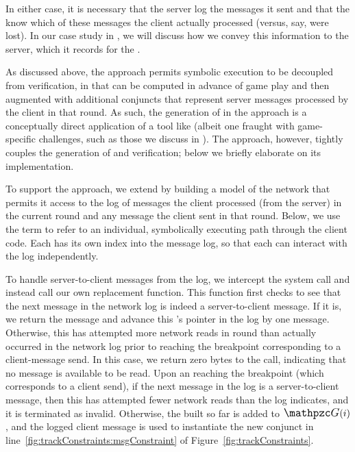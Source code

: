 In either case, it is necessary that the server log the messages it
sent and that the \verifier know which of these messages the client
actually processed (versus, say, were lost).  In our case study in
, we will discuss how we convey this information to
the server, which it records for the \verifier.

As discussed above, the \eager approach permits symbolic execution to
be decoupled from verification, in that \eager \pathsegcons can be
computed in advance of game play and then augmented with additional
conjuncts that represent server messages processed by the client in
that round.  As such, the generation of \pathsegcons in the \eager
approach is a conceptually direct application of a tool like \klee
(albeit one fraught with game-specific challenges, such as those we
discuss in ).  The \lazy approach,
however, tightly couples the generation of \pathsegcons and
verification; below we briefly elaborate on its implementation.

To support the \lazy approach, we extend \klee by building a model of
the network that permits it access to the log of messages the client
processed (from the server) in the current round \roundidx and any
message the client sent in that round.  Below, we use the term {\em
\thread} to refer to an individual, symbolically executing path
through the client code.  Each \thread has its own index into the
message log, so that each can interact with the log independently.

To handle server-to-client messages from the log, we intercept the
\recv system call and instead call our own replacement function.  This
function first checks to see that the next message in the network log
is indeed a server-to-client message.  If it is, we return the message
and advance this \thread's pointer in the log by one message.
Otherwise, this \thread has attempted more network reads in round
\roundidx than actually occurred in the network log prior to reaching
the breakpoint corresponding to a client-message send.  In this case,
we return zero bytes to the \recv call, indicating that no message is
available to be read.  Upon an \thread reaching the breakpoint (which
corresponds to a client send), if the next message in the log is a
server-to-client message, then this \thread has attempted fewer
network reads than the log indicates, and it is terminated as invalid.
Otherwise, the \pathsegcon built so far is added to
$\genericPathConstraints(\roundidx)$, and the logged client message is
used to instantiate the new conjunct \msgConstraint in
line~\ref{fig:trackConstraints:msgConstraint} of
Figure~\ref{fig:trackConstraints}.

